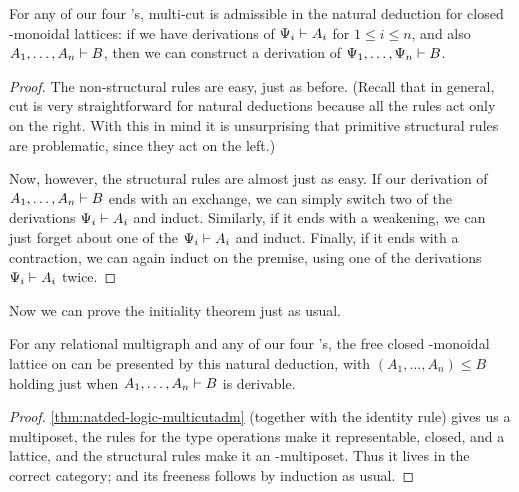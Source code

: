 \begin{lem}\label{thm:natded-logic-multicutadm}
  For any of our four \fS's, multi-cut is admissible in the natural deduction for closed \fS-monoidal lattices: if we have derivations of $\Psi_i\vdash A_i$ for $1\le i\le n$, and also $A_1,\dots,A_n \vdash B$, then we can construct a derivation of $\Psi_1,\dots,\Psi_n\vdash B$.
\end{lem}
\begin{proof}
  The non-structural rules are easy, just as before.
  (Recall that in general, cut is very straightforward for natural deductions because all the rules act only on the right.
  With this in mind it is unsurprising that primitive structural rules are problematic, since they act on the left.)

  Now, however, the structural rules are almost just as easy.
  If our derivation of $A_1,\dots,A_n \vdash B$ ends with an exchange, we can simply switch two of the derivations $\Psi_i\vdash A_i$ and induct.
  Similarly, if it ends with a weakening, we can just forget about one of the $\Psi_i\vdash A_i$ and induct.
  Finally, if it ends with a contraction, we can again induct on the premise, using one of the derivations $\Psi_i\vdash A_i$ twice.
\end{proof}

Now we can prove the initiality theorem just as usual.

\begin{thm}\label{thm:natded-logic-initial}
  For any relational multigraph \cG and any of our four \fS's, the free closed \fS-monoidal lattice on \cG can be presented by this natural deduction, with $(A_1,\dots,A_n)\le B$ holding just when $A_1,\dots,A_n\vdash B$ is derivable.
\end{thm}
\begin{proof}
  \cref{thm:natded-logic-multicutadm} (together with the identity rule) gives us a multiposet, the rules for the type operations make it representable, closed, and a lattice, and the structural rules make it an \fS-multiposet.
  Thus it lives in the correct category; and its freeness follows by induction as usual.
\end{proof}

